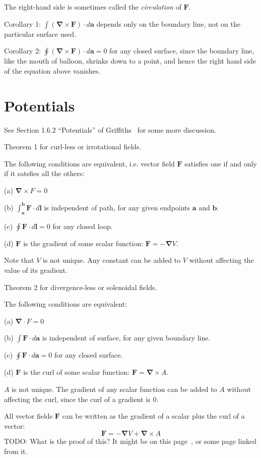 \documentclass[a4paper]{article}
\theoremstyle{plain}
\theoremstyle{definition}
\newcommand{\vect}[1]{\textbf{#1}}
\newcommand{\del}{\bm{\nabla}}
\begin{document}
The right-hand side is sometimes called the {\em circulation} of
$\vect{F}$.

Corollary 1: $\int (\del \times \vect{F}) \cdot d\vect{a}$ depends
only on the boundary line, not on the particular surface used.

Corollary 2: $\oint (\del \times \vect{F}) \cdot d\vect{a} = 0$ for
any closed surface, since the boundary line, like the mouth of
balloon, shrinks down to a point, and hence the right hand side of the
equation above vanishes.


\section{Potentials}

See Section 1.6.2 ``Potentials'' of Griffiths~\cite{Griffiths1998} for
some more discussion.

Theorem 1 for curl-less or irrotational fields.

The following conditions are equivalent, i.e. vector field $\vect{F}$
satisfies one if and only if it satsfies all the others:

(a) $\del \times F = 0$

(b) $\int_{\vect{a}}^{\vect{b}} \vect{F} \cdot d\vect{l}$ is
independent of path, for any given endpoints $\vect{a}$ and
$\vect{b}$.

(c) $\oint \vect{F} \cdot d\vect{l} = 0$ for any closed loop.

(d) $\vect{F}$ is the gradient of some scalar function: $\vect{F} =
-\del V$.

Note that $V$ is not unique.  Any constant can be added to $V$ without
affecting the value of its gradient.

Theorem 2 for divergence-less or solenoidal fields.

The following conditions are equivalent:

(a) $\del \cdot F = 0$

(b) $\int \vect{F} \cdot d\vect{a}$ is independent of surface, for any
given boundary line.

(c) $\oint \vect{F} \cdot d\vect{a} = 0$ for any closed surface.

(d) $\vect{F}$ is the curl of some scalar function: $\vect{F} = \del
\times A$.

$A$ is not unique.  The gradient of any scalar function can be added
to $A$ without affecting the curl, since the curl of a gradient is 0.

All vector fields $\vect{F}$ can be written as the gradient of a
scalar plus the curl of a vector:
\begin{equation}
\vect{F} = - \del V + \del \times A
\end{equation}
TODO: What is the proof of this?  It might be on this
page~\cite{WikipediaHelmholtzDecomposition}, or some page linked from
it.
\end{document}
